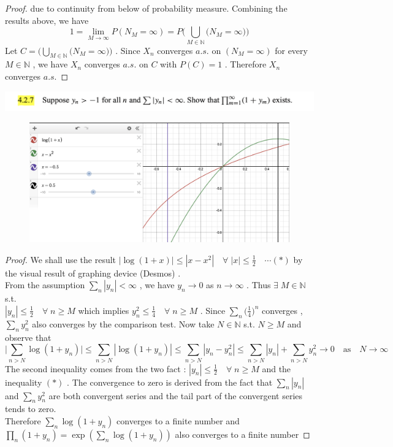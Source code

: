 \documentclass[12pt, A4]{article}
\newcommand{\N}{\mathbb{N}}
\begin{document}
\begin{proof}
    due to continuity from below of probability measure. Combining the results above, we have $$1=\lim_{M\rightarrow \infty}P(N_M=\infty)=P\Big(\bigcup_{M\in \N}\big( N_M=\infty\big)\Big) $$ Let $C=\Big(\bigcup_{M\in \N}\big( N_M=\infty\big)\Big)$ . Since $X_n$ converges $a.s.$ on $(N_M=\infty)$ for every $M\in \N$ , we have $X_n$ converges $a.s.$ on $C$ with $P(C)=1$ . Therefore $X_n$ converges $a.s.$
\end{proof}
\vspace{1cm}

\includegraphics[width=17cm]{Exer4.2.7.png}
\begin{figure}[h]
    \includegraphics[width=17cm]{Graph4.2.7.png}
\end{figure}
\begin{proof}
    We shall use the result $|\log(1+x)|\leq |x-x^2| \quad \forall \; |x|\leq \frac{1}{2}\quad \cdots (*)$ by the visual result of graphing device (Desmos) . \\ From the assumption $\sum_n |y_n|<\infty$ , we have $y_n\rightarrow 0$ as $n\rightarrow \infty$ . Thus $\exists \;M\in \N\;$ s.t. \\$|y_n|\leq \frac{1}{2}\quad \forall\; n\geq M$ which implies $y_n^2\leq \frac{1}{4} \quad \forall \; n\geq M$ . Since $\sum_n \big(\frac{1}{4}\big)^n$ converges , $\sum_n y_n^2$ also converges by the comparison test. Now take $N\in \N$ s.t. $N\geq M$ and observe that
    $$\Big|\sum_{n>N} \log(1+y_n)\Big|\leq \sum_{n>N}|\log(1+y_n)|\leq \sum_{n>N}|y_n-y_n^2|\leq \sum_{n>N}|y_n| + \sum_{n>N}y_n^2\longrightarrow 0\quad \text{as} \quad N\rightarrow \infty$$
    The second inequality comes from the two fact : $|y_n|\leq \frac{1}{2} \quad \forall \; n\geq M$ and the inequality $(*)$ . The convergence to zero is derived from the fact that $\sum_n |y_n|$ and $\sum_n y_n^2$ are both convergent series and the tail part of the convergent series tends to zero. \\
    Therefore $\sum_n \log(1+y_n)$ converges to a finite number and $\prod_n (1+y_n)=\exp(\sum_n\log(1+y_n))$ also converges to a finite number 
\end{proof}
\vspace{1cm}
\end{document}
